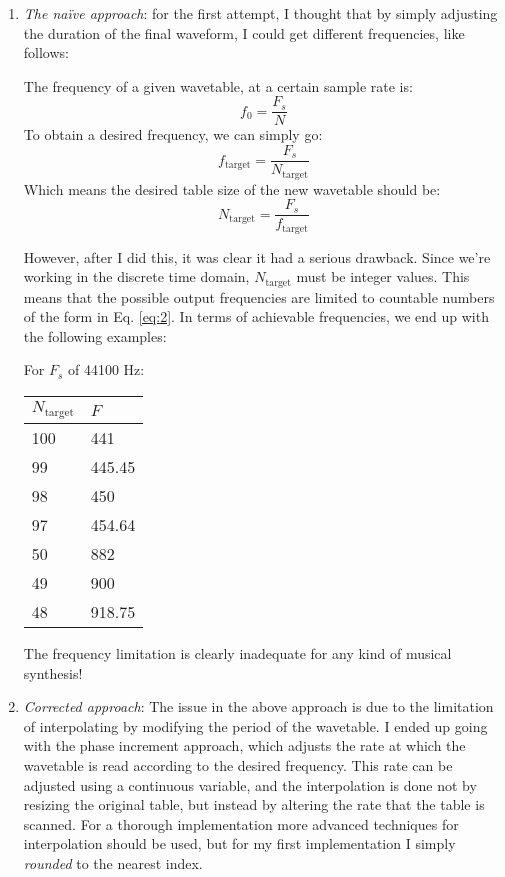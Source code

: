 \documentclass[12pt]{article}
\begin{document}
\begin{enumerate}
\item {\textit{The na{\"i}ve approach}: for the first attempt, I thought that by simply adjusting the duration of the final waveform, I could get different frequencies, like follows:

The frequency of a given wavetable, at a certain sample rate is:
\begin{equation}
f_0 = \frac{F_s}{N}
\end{equation}
To obtain a desired frequency, we can simply go:
\begin{equation}\label{eq:2}
f_{\text{target}} = \frac{F_s}{N_{\text{target}}}
\end{equation}
Which means the desired table size of the new wavetable should be:
\begin{equation}
N_{\text{target}} = \frac{F_s}{f_{\text{target}}}
\end{equation}

However, after I did this, it was clear it had a serious drawback. Since we're working in the discrete time domain, $N_{\text{target}}$ must be integer values. This means that the possible output frequencies are limited to countable numbers of the form in Eq. \ref{eq:2}. In terms of achievable frequencies, we end up with the following examples:

For $F_s$ of 44100 Hz:
\begin{table}[H]\centering
\begin{tabular}{ll}
\hline
$N_{\text{target}}$	& $F$ \\
\hline
100 & 441\\
99	& 445.45\\
98	& 450\\
97	& 454.64\\
50	& 882\\
49	& 900\\
48	& 918.75\\
\hline
\end{tabular}
\end{table}

The frequency limitation is clearly inadequate for any kind of musical synthesis!}


\item {\textit{Corrected approach}: The issue in the above approach is due to the limitation of interpolating by modifying the period of the wavetable. I ended up going with the phase increment approach, which adjusts the rate at which the wavetable is read according to the desired frequency. This rate can be adjusted using a continuous variable, and the interpolation is done not by resizing the original table, but instead by altering the rate that the table is scanned. For a thorough implementation more advanced techniques for interpolation should be used, but for my first implementation I simply \textit{rounded} to the nearest index.}

\end{enumerate}
\end{document}
